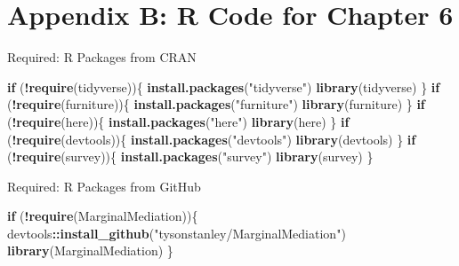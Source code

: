 \documentclass[]{DissertateUSU}
\newenvironment{Shaded}{\begin{snugshade}}{\end{snugshade}}
\newcommand{\KeywordTok}[1]{\textcolor[rgb]{0.13,0.29,0.53}{\textbf{#1}}}
\newcommand{\StringTok}[1]{\textcolor[rgb]{0.31,0.60,0.02}{#1}}
\newcommand{\ControlFlowTok}[1]{\textcolor[rgb]{0.13,0.29,0.53}{\textbf{#1}}}
\newcommand{\OperatorTok}[1]{\textcolor[rgb]{0.81,0.36,0.00}{\textbf{#1}}}
\newcommand{\NormalTok}[1]{#1}
\begin{document}
\normalsize
\clearpage

\doublespacing

\section*{Appendix B: R Code for Chapter
6}\label{appendix-b-r-code-for-chapter-6}

\singlespace

Required: R Packages from CRAN

\small

\begin{Shaded}
\begin{Highlighting}[]
\ControlFlowTok{if}\NormalTok{ (}\OperatorTok{!}\KeywordTok{require}\NormalTok{(tidyverse))\{}
  \KeywordTok{install.packages}\NormalTok{(}\StringTok{"tidyverse"}\NormalTok{)}
  \KeywordTok{library}\NormalTok{(tidyverse)}
\NormalTok{\}}
\ControlFlowTok{if}\NormalTok{ (}\OperatorTok{!}\KeywordTok{require}\NormalTok{(furniture))\{}
  \KeywordTok{install.packages}\NormalTok{(}\StringTok{"furniture"}\NormalTok{)}
  \KeywordTok{library}\NormalTok{(furniture)}
\NormalTok{\}}
\ControlFlowTok{if}\NormalTok{ (}\OperatorTok{!}\KeywordTok{require}\NormalTok{(here))\{}
  \KeywordTok{install.packages}\NormalTok{(}\StringTok{"here"}\NormalTok{)}
  \KeywordTok{library}\NormalTok{(here)}
\NormalTok{\}}
\ControlFlowTok{if}\NormalTok{ (}\OperatorTok{!}\KeywordTok{require}\NormalTok{(devtools))\{}
  \KeywordTok{install.packages}\NormalTok{(}\StringTok{"devtools"}\NormalTok{)}
  \KeywordTok{library}\NormalTok{(devtools)}
\NormalTok{\}}
\ControlFlowTok{if}\NormalTok{ (}\OperatorTok{!}\KeywordTok{require}\NormalTok{(survey))\{}
  \KeywordTok{install.packages}\NormalTok{(}\StringTok{"survey"}\NormalTok{)}
  \KeywordTok{library}\NormalTok{(survey)}
\NormalTok{\}}
\end{Highlighting}
\end{Shaded}

\normalsize

Required: R Packages from GitHub

\small

\begin{Shaded}
\begin{Highlighting}[]
\ControlFlowTok{if}\NormalTok{ (}\OperatorTok{!}\KeywordTok{require}\NormalTok{(MarginalMediation))\{}
\NormalTok{  devtools}\OperatorTok{::}\KeywordTok{install_github}\NormalTok{(}\StringTok{"tysonstanley/MarginalMediation"}\NormalTok{)}
  \KeywordTok{library}\NormalTok{(MarginalMediation)}
\NormalTok{\}}
\end{Highlighting}
\end{Shaded}
\end{document}
